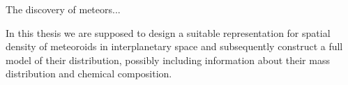 
The discovery of meteors...

In this thesis we are supposed to design a suitable representation for spatial density of meteoroids in interplanetary space and
subsequently construct a full model of their distribution, possibly including information about their mass distribution and chemical composition.
